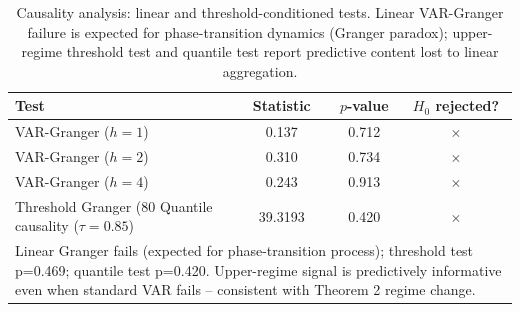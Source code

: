 \begin{table}[h]
\centering
\caption{Causality analysis: linear and threshold-conditioned tests. Linear VAR-Granger failure is expected for phase-transition dynamics (Granger paradox); upper-regime threshold test and quantile test report predictive content lost to linear aggregation.}
\label{tab:causality}
\begin{tabular}{lccc}
\toprule
Test & Statistic & $p$-value & $H_0$ rejected? \\
\midrule
  VAR-Granger ($h=1$) & 0.137 & 0.712 & {\color{red}$\times$} \\
  VAR-Granger ($h=2$) & 0.310 & 0.734 & {\color{red}$\times$} \\
  VAR-Granger ($h=4$) & 0.243 & 0.913 & {\color{red}$\times$} \\
  Threshold Granger (80%
  Quantile causality ($\tau=0.85$) & 39.3193 & 0.420 & {\color{red}$\times$} \\
\bottomrule
\multicolumn{4}{p{0.85\textwidth}}{\footnotesize Linear Granger fails (expected for phase-transition process); threshold test p=0.469; quantile test p=0.420. Upper-regime signal is predictively informative even when standard VAR fails -- consistent with Theorem 2 regime change.} \\
\end{tabular}
\end{table}